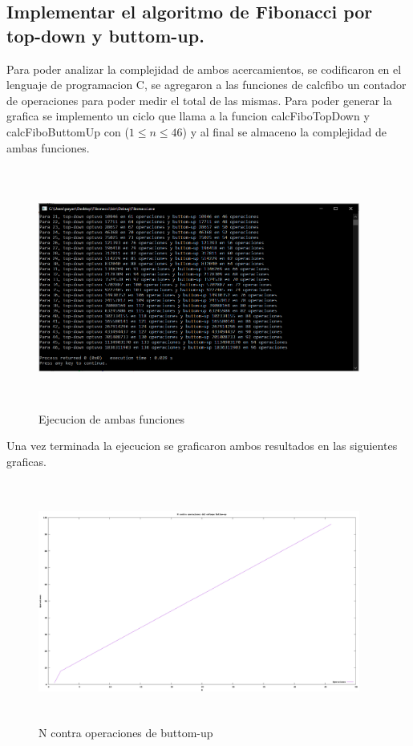 \documentclass[spanish]{article}
\begin{document}
	\subsection{Implementar el algoritmo de Fibonacci por top-down y buttom-up.}
	Para poder analizar la complejidad de ambos acercamientos, se codificaron en el lenguaje de programacion C, se agregaron a las funciones de calcfibo un contador de operaciones para poder medir el total de las mismas. Para poder generar la grafica se implemento un ciclo que llama a la funcion calcFiboTopDown y calcFiboButtomUp con ($1\leq n\leq 46$) y al final se almaceno la complejidad de ambas funciones.\\
	\begin{figure}[H]
		\centering
		\includegraphics[width=400px,height=300px]{captura1}
		\caption{Ejecucion de ambas funciones}
	\end{figure}
	Una vez terminada la ejecucion se graficaron ambos resultados en las siguientes graficas.\\
	\begin{figure}[H]
		\centering
		\includegraphics[width=400px,height=300px]{grafica1}
		\caption{N contra operaciones de buttom-up}
	\end{figure}
\end{document}
